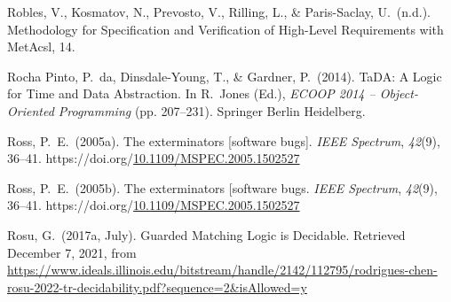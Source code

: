 \documentclass[12pt,twoside]{article}
\begin{document}
{\begin{thebibliography}{1079}
\mdbibitemlabel{}Robles, V., Kosmatov, N., Prevosto, V., Rilling, L., \& Paris-Saclay, U.~(n.d.). Methodology for Speciﬁcation and Veriﬁcation of High-Level Requirements with MetAcsl, 14.%

\mdbibitemlabel{}Rocha Pinto, P.~da, Dinsdale-Young, T., \& Gardner, P.~(2014). TaDA: A Logic for Time and Data Abstraction. In R.~Jones (Ed.), \emph{ECOOP 2014 – Object-Oriented Programming} (pp. 207–231). Springer Berlin Heidelberg.%

\mdbibitemlabel{}Ross, P.~E.~(2005a). The exterminators {}[software bugs]. \emph{IEEE Spectrum}, \emph{42}(9), 36–41. https://doi.org/\href{https://dx.doi.org/10.1109/MSPEC.2005.1502527}{10.1109/MSPEC.2005.1502527}%

\mdbibitemlabel{}Ross, P.~E.~(2005b). The exterminators {}[software bugs. \emph{IEEE Spectrum}, \emph{42}(9), 36–41. https://doi.org/\href{https://dx.doi.org/10.1109/MSPEC.2005.1502527}{10.1109/MSPEC.2005.1502527}%

\mdbibitemlabel{}Rosu, G.~(2017a, July). Guarded Matching Logic is Decidable. Retrieved December 7, 2021, from \href{https://www.ideals.illinois.edu/bitstream/handle/2142/112795/rodrigues-chen-rosu-2022-tr-decidability.pdf?sequence=2\%26isAllowed=y}{{\ttfamily https://\hspace{0pt}www.\hspace{0pt}ideals.\hspace{0pt}illinois.\hspace{0pt}edu/\hspace{0pt}bitstream/\hspace{0pt}handle/\hspace{0pt}2142/\hspace{0pt}112795/\hspace{0pt}rodrigues-\hspace{0pt}chen-\hspace{0pt}rosu-\hspace{0pt}2022-\hspace{0pt}tr-\hspace{0pt}decidability.\hspace{0pt}pdf?\hspace{0pt}sequence=\hspace{0pt}2\&\hspace{0pt}isAllowed=\hspace{0pt}y}}%


\end{thebibliography}}
\end{document}
